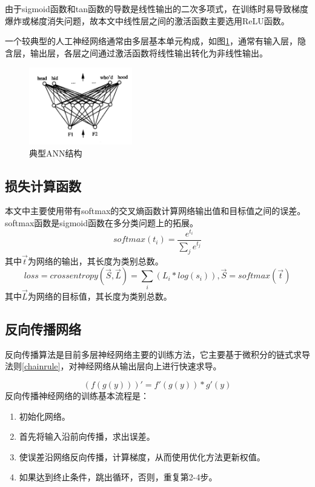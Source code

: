 由于sigmoid函数和tan函数的导数是线性输出的二次多项式，在训练时易导致梯度爆炸或梯度消失问题，故本文中线性层之间的激活函数主要选用ReLU函数。\par
一个较典型的人工神经网络通常由多层基本单元构成，如图\ref{ann2}，通常有输入层，隐含层，输出层，各层之间通过激活函数将线性输出转化为非线性输出。\par

\begin{figure}[!hbp]
\begin{center}
\includegraphics[width=0.4\textwidth]{graphic/ann2.png}
\caption{典型ANN结构\cite{ml2006} \label{ann2}}
\end{center}
\end{figure}

\subsection{损失计算函数}
本文中主要使用带有softmax的交叉熵函数计算网络输出值和目标值之间的误差。softmax函数是sigmoid函数在多分类问题上的拓展。
\begin{equation}
softmax(t_i) = \frac{e^{t_i}}{\sum_j{e^{t_j}}}
\end{equation}
其中$\vec{t}$为网络的输出，其长度为类别总数。
\begin{equation}
loss = crossentropy(\vec{S}, \vec{L}) 
= \sum_i {(L_i * log(s_i))}, \vec{S} = softmax{(\vec{t})}
\end{equation}
其中$\vec{L}$为网络的目标值，其长度为类别总数。

\subsection{反向传播网络}
反向传播算法是目前多层神经网络主要的训练方法，它主要基于微积分的链式求导法则\ref{chainrule}，对神经网络从输出层向上进行快速求导。

\begin{equation} \label{chainrule}
(f(g(y)))' = f'(g(y)) * g'(y)
\end{equation}
反向传播神经网络的训练基本流程是：\par
\begin{enumerate}
\item 初始化网络。
\item 首先将输入沿前向传播，求出误差。
\item 使误差沿网络反向传播，计算梯度，从而使用优化方法更新权值。
\item 如果达到终止条件，跳出循环，否则，重复第2-4步。
\end{enumerate}

